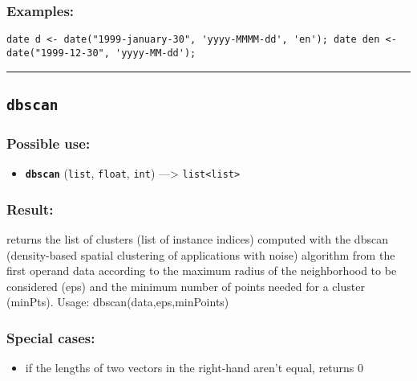 \documentclass[]{book}
\providecommand{\tightlist}{%
  \setlength{\itemsep}{0pt}\setlength{\parskip}{0pt}}
\theoremstyle{definition}
\theoremstyle{definition}
\theoremstyle{definition}
\theoremstyle{remark}
\begin{document}
\subsubsection{Examples:}\label{examples-94}

\begin{verbatim}
date d <- date("1999-january-30", 'yyyy-MMMM-dd', 'en'); date den <- date("1999-12-30", 'yyyy-MM-dd'); 
\end{verbatim}

\begin{center}\rule{0.5\linewidth}{\linethickness}\end{center}

\subsection{\texorpdfstring{\texttt{dbscan}}{dbscan}}\label{dbscan}

\subsubsection{Possible use:}\label{possible-use-125}

\begin{itemize}
\tightlist
\item
  \textbf{\texttt{dbscan}} (\texttt{list}, \texttt{float}, \texttt{int})
  ---\textgreater{} \texttt{list\textless{}list\textgreater{}}
\end{itemize}

\subsubsection{Result:}\label{result-121}

returns the list of clusters (list of instance indices) computed with
the dbscan (density-based spatial clustering of applications with noise)
algorithm from the first operand data according to the maximum radius of
the neighborhood to be considered (eps) and the minimum number of points
needed for a cluster (minPts). Usage: dbscan(data,eps,minPoints)

\subsubsection{Special cases:}\label{special-cases-49}

\begin{itemize}
\tightlist
\item
  if the lengths of two vectors in the right-hand aren't equal, returns
  0
\end{itemize}
\end{document}
